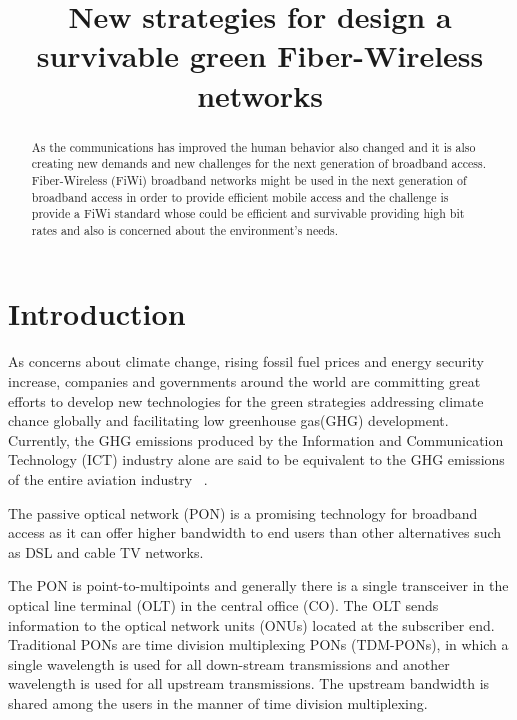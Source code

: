 \documentclass[conference,compsoc]{IEEEtran}
\begin{document}
\title{New strategies for design a survivable green Fiber-Wireless networks}

\author{
}
\maketitle

\printindex

\begin{abstract}
As the communications has improved the human behavior also changed and it is also creating new demands and new challenges for the next generation of broadband access.
Fiber-Wireless (FiWi) broadband networks might be used in the next generation of broadband access in order to provide efficient mobile access and the challenge is provide a FiWi standard whose could be efficient and survivable providing high bit rates  and  also is concerned  about  the environment's needs.
\end{abstract}

\IEEEpeerreviewmaketitle




\section{Introduction}
\label{section:Introduction}
As concerns about climate change, rising fossil fuel prices and energy security increase, companies 
and governments around the world are committing great efforts to develop new technologies for the 
green strategies addressing climate chance globally and facilitating low greenhouse gas(GHG) 
development. Currently, the GHG emissions produced by the Information and Communication Technology 
(ICT) industry alone are said to be equivalent to the GHG emissions of the entire aviation industry 
~\cite{yu2012green}.


The passive optical network (PON) is a promising technology for broadband access as it can offer 
higher bandwidth to end users than other alternatives such as DSL and cable TV networks. 

The PON is point-to-multipoints and generally there is a single transceiver in the optical line 
terminal (OLT) in the central office (CO). The OLT sends information to the optical network units 
(ONUs) located at the subscriber end.
Traditional PONs are time division multiplexing PONs (TDM-PONs), in which a single wavelength is 
used for all down-stream transmissions and another wavelength is used for all upstream 
transmissions. The upstream bandwidth is shared among the users in the manner of time division 
multiplexing.
\end{document}
